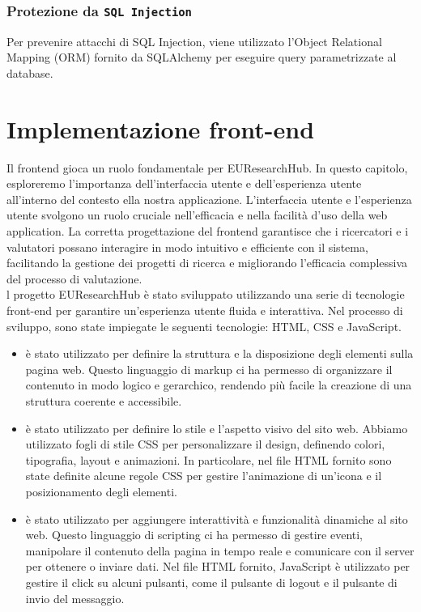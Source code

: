 \documentclass{report}
\begin{document}
\subsection{Protezione da \texttt{SQL Injection} }
Per prevenire attacchi di SQL Injection, viene utilizzato l'Object Relational Mapping (ORM) fornito da SQLAlchemy per eseguire query parametrizzate al database. 


\chapter{Implementazione front-end}
Il frontend gioca un ruolo fondamentale per EUResearchHub. In questo capitolo, esploreremo l'importanza dell'interfaccia utente e dell'esperienza utente all'interno del contesto ella nostra applicazione. L'interfaccia utente e l'esperienza utente svolgono un ruolo cruciale nell'efficacia e nella facilità d'uso della web application. La corretta progettazione del frontend garantisce che i ricercatori e i valutatori possano interagire in modo intuitivo e efficiente con il sistema, facilitando la gestione dei progetti di ricerca e migliorando l'efficacia complessiva del processo di valutazione.\\
l progetto EUResearchHub è stato sviluppato utilizzando una serie di tecnologie front-end per garantire un'esperienza utente fluida e interattiva. Nel processo di sviluppo, sono state impiegate le seguenti tecnologie: HTML, CSS e JavaScript.
\begin{itemize}
\item {} è stato utilizzato per definire la struttura e la disposizione degli elementi sulla pagina web. Questo linguaggio di markup ci ha permesso di organizzare il contenuto in modo logico e gerarchico, rendendo più facile la creazione di una struttura coerente e accessibile.

\item {} è stato utilizzato per definire lo stile e l'aspetto visivo del sito web. Abbiamo utilizzato fogli di stile CSS per personalizzare il design, definendo colori, tipografia, layout e animazioni. In particolare, nel file HTML fornito sono state definite alcune regole CSS per gestire l'animazione di un'icona e il posizionamento degli elementi.

\item {} è stato utilizzato per aggiungere interattività e funzionalità dinamiche al sito web. Questo linguaggio di scripting ci ha permesso di gestire eventi, manipolare il contenuto della pagina in tempo reale e comunicare con il server per ottenere o inviare dati. Nel file HTML fornito, JavaScript è utilizzato per gestire il click su alcuni pulsanti, come il pulsante di logout e il pulsante di invio del messaggio.
\end{itemize}
\end{document}
